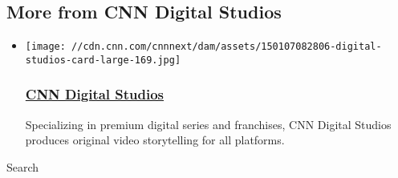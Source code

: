 \hypertarget{more-from-cnn-digital-studios-}{%
\subsection{More from CNN Digital
Studios~}\label{more-from-cnn-digital-studios-}}

\begin{itemize}
\item
  \href{/specials/digital-studios}{}

  \texttt{[image: //cdn.cnn.com/cnnnext/dam/assets/150107082806-digital-studios-card-large-169.jpg]}

  \hypertarget{cnn-digital-studios}{%
  \subsubsection{\texorpdfstring{\href{/specials/digital-studios}{CNN
  Digital Studios}}{CNN Digital Studios}}\label{cnn-digital-studios}}

  Specializing in premium digital series and franchises, CNN Digital
  Studios produces original video storytelling for all platforms.
\end{itemize}

Search

